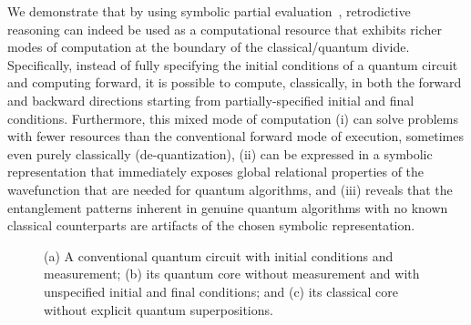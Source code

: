 \documentclass[aps,prl,twocolumn,superscriptaddress,floatfix,notitlepage]{revtex4-2}
\begin{document}
We demonstrate that by using symbolic partial
evaluation~\cite{futamura}, retrodictive reasoning can indeed be used
as a computational resource that exhibits richer modes of computation
at the boundary of the classical/quantum divide. Specifically, instead
of fully specifying the initial conditions of a quantum circuit and
computing forward, it is possible to compute, classically, in both the
forward and backward directions starting from partially-specified
initial and final conditions. Furthermore, this mixed mode of
computation (i) can solve problems with fewer resources than the
conventional forward mode of execution, sometimes even purely
classically (de-quantization), (ii) can be expressed in a symbolic
representation that immediately exposes global relational properties
of the wavefunction that are needed for quantum algorithms, and (iii)
reveals that the entanglement patterns inherent in genuine quantum
algorithms with no known classical counterparts are artifacts of the
chosen symbolic representation.

\begin{figure}[b]
\quad
{}
\quad
{}
\caption{\label{fig:bellall} (a) A conventional quantum circuit with
  initial conditions and measurement; (b) its quantum core without
  measurement and with unspecified initial and final conditions; and
  (c) its classical core without explicit quantum superpositions.}
\end{figure}
\end{document}
